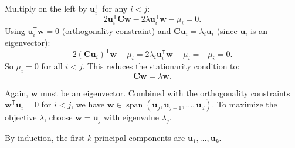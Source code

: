 \begin{remark}
  Multiply on the left by $\mathbf{u}_i^{\mathsf{T}}$ for any $i < j$:
  \[
    2\mathbf{u}_i^{\mathsf{T}}\mathbf{C}\mathbf{w} - 2\lambda \mathbf{u}_i^{\mathsf{T}}\mathbf{w} - \mu_i = 0.
  \]
  Using $\mathbf{u}_i^{\mathsf{T}}\mathbf{w} = 0$ (orthogonality constraint) and $\mathbf{C}\mathbf{u}_i = \lambda_i \mathbf{u}_i$ (since $\mathbf{u}_i$ is an eigenvector):
  \[
    2(\mathbf{C}\mathbf{u}_i)^{\mathsf{T}}\mathbf{w} - \mu_i = 2\lambda_i \mathbf{u}_i^{\mathsf{T}}\mathbf{w} - \mu_i = -\mu_i = 0.
  \]
  So $\mu_i = 0$ for all $i < j$. This reduces the stationarity condition to:
  \[
    \mathbf{C}\mathbf{w} = \lambda\mathbf{w}.
  \]

  Again, $\mathbf{w}$ must be an eigenvector. Combined with the orthogonality constraints $\mathbf{w}^{\mathsf{T}}\mathbf{u}_i = 0$ for $i < j$, we have $\mathbf{w} \in \operatorname{span}(\mathbf{u}_j,\mathbf{u}_{j+1},\dots,\mathbf{u}_d)$. To maximize the objective $\lambda$, choose $\mathbf{w} = \mathbf{u}_j$ with eigenvalue $\lambda_j$.

  By induction, the first $k$ principal components are $\mathbf{u}_1,\dots,\mathbf{u}_k$.
\end{remark}

